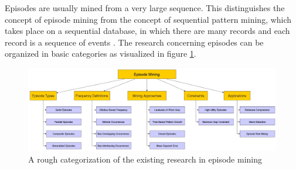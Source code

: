 Episodes are usually mined from a very large sequence. This distinguishes the concept of episode mining from the concept of sequential pattern mining, which takes place on a sequential database, in which there are many records and each record is a sequence of events \cite{wu2013mining}.
The research concerning episodes can be organized in basic categories as visualized in figure \ref{fig_episodeOverview}.

\begin{figure}[h]
	\centering
  	\includegraphics[width=\textwidth]{episodeOverview}
	\caption{A rough categorization of the existing research in episode mining}
	\label{fig_episodeOverview}
\end{figure}


